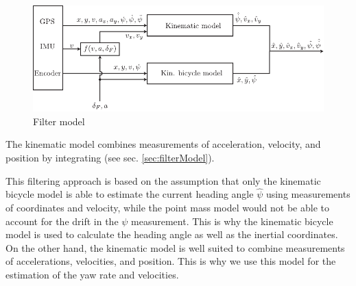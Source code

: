 \begin{figure}[ht]
    \centering
      \includegraphics{../../Figures/Illustrator/FilterModel.pdf}
    \caption{Filter model}
    \label{fig:filter_model}
\end{figure}
The kinematic model combines measurements of acceleration, velocity, and position by integrating (see sec. \ref{sec:filterModel}).

This filtering approach is based on the assumption that only the kinematic bicycle model is able to estimate the current heading angle $\hat\psi$ using measurements of coordinates and velocity, while the point mass model would not be able to account for the drift in the $\psi$ measurement. This is why the kinematic bicycle model is used to calculate the heading angle as well as the inertial coordinates. On the other hand, the kinematic model is well suited to combine measurements of accelerations, velocities, and position. This is why we use this model for the estimation of the yaw rate and velocities.

